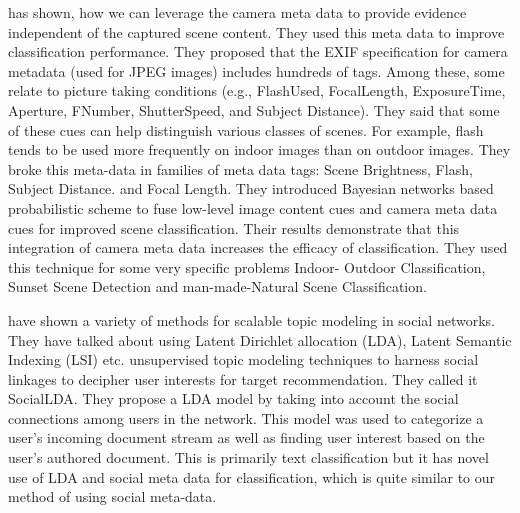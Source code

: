 \citet*{Boutell2005935} has shown, how we can leverage the camera 
meta data to provide evidence independent of the captured scene 
content. They used this meta data to improve classification 
performance. They proposed that the EXIF specification for camera 
metadata (used for JPEG images) includes hundreds of tags. Among 
these, some relate to picture taking conditions (e.g., FlashUsed, 
FocalLength, ExposureTime, Aperture, FNumber, ShutterSpeed, and 
Subject Distance). They said that some of these cues can help 
distinguish various classes of scenes. For example, flash tends to 
be used more frequently on indoor images than on outdoor images. 
They broke this meta-data in families of meta data tags: Scene 
Brightness, Flash, Subject Distance. and Focal Length. They 
introduced  Bayesian networks based  probabilistic scheme to fuse low-level 
image content cues and camera meta data cues for improved scene 
classification. Their results demonstrate that  this integration of 
camera meta data increases the efficacy of classification. 
They used this technique for some very specific problems  Indoor-
Outdoor Classification, Sunset Scene Detection and man-made-Natural 
Scene Classification.


 have shown a variety of methods for scalable 
topic modeling in social networks.  They have talked about using 
Latent Dirichlet allocation (LDA), Latent Semantic Indexing (LSI) etc.
unsupervised topic modeling techniques to harness social linkages 
to decipher user interests for target recommendation. They called it 
SocialLDA. They propose a LDA model by taking into account the 
social connections among users in the network. This model was used 
to categorize a user's incoming document stream as well as finding 
user interest based on the user’s authored document. This is 
primarily text classification but it has novel use of LDA and 
social meta data for classification, which is quite 
similar to our method of using social meta-data.

